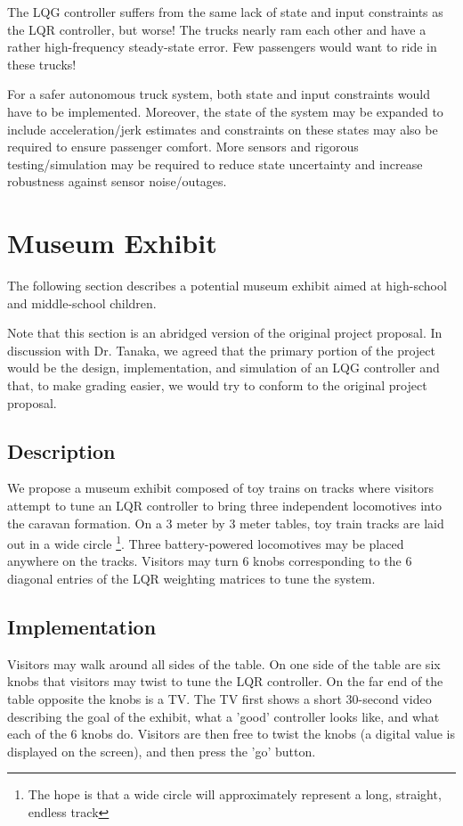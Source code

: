 \documentclass[12pt,onecolumn,reqno]{amsart}
\begin{document}
The LQG controller suffers from the same lack of state and input constraints as
the LQR controller, but worse! The trucks nearly ram each other and have a
rather high-frequency steady-state error. Few passengers would want to ride in
these trucks!

For a safer autonomous truck system, both state and input constraints would have
to be implemented. Moreover, the state of the system may be expanded to include
acceleration/jerk estimates and constraints on these states may also be required
to ensure passenger comfort. More sensors and rigorous testing/simulation may be
required to reduce state uncertainty and increase robustness against sensor
noise/outages.


\section{Museum Exhibit}
The following section describes a potential museum exhibit aimed at high-school
and middle-school children.

Note that this section is an abridged version of the original project proposal.
In discussion with Dr. Tanaka, we agreed that the primary portion of the project
would be the design, implementation, and simulation of an LQG controller and
that, to make grading easier, we would try to conform to the original project
proposal.

\subsection{Description}
We propose a museum exhibit composed of toy trains on tracks where visitors
attempt to tune an LQR controller to bring three independent locomotives into
the caravan formation. On a 3 meter by 3 meter tables, toy train tracks are laid
out in a wide circle \footnote {The hope is that a wide circle will
approximately represent a long, straight, endless track}. Three battery-powered
locomotives may be placed anywhere on the tracks. Visitors may turn 6 knobs
corresponding to the 6 diagonal entries of the LQR weighting matrices to tune
the system.


\subsection{Implementation}
Visitors may walk around all sides of the table. On one side of the table are
six knobs that visitors may twist to tune the LQR controller. On the far end of
the table opposite the knobs is a TV. The TV first shows a short 30-second video
describing the goal of the exhibit, what a 'good' controller looks like, and
what each of the 6 knobs do. Visitors are then free to twist the knobs (a
digital value is displayed on the screen), and then press the 'go' button.
\end{document}
